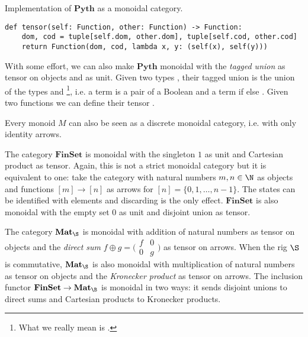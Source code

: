 \begin{python}
{\normalfont Implementation of $\mathbf{Pyth}$ as a monoidal category.}

\begin{verbatim}
def tensor(self: Function, other: Function) -> Function:
    dom, cod = tuple[self.dom, other.dom], tuple[self.cod, other.cod]
    return Function(dom, cod, lambda x, y: (self(x), self(y)))
\end{verbatim}
\end{python}

\begin{example}
With some effort, we can also make $\mathbf{Pyth}$ monoidal with the \emph{tagged union} as tensor on objects and  as unit.
Given two types , their tagged union  is the union of the types  and \footnote
{What we really mean is .}, i.e. a term  is a pair of a Boolean  and a term  if  else .
Given two functions  we can define their tensor .
\end{example}

\begin{example}
Every monoid $M$ can also be seen as a discrete monoidal category, i.e. with only identity arrows.
\end{example}

\begin{example}
The category $\mathbf{FinSet}$ is monoidal with the singleton $1$ as unit and Cartesian product as tensor.
Again, this is not a strict monoidal category but it is equivalent to one: take the category with natural numbers $m, n \in \N$ as objects and functions $[m] \to [n]$ as arrows for $[n] = \{ 0, 1, \dots, n - 1 \}$.
The states can be identified with elements and discarding is the only effect.
$\mathbf{FinSet}$ is also monoidal with the empty set $0$ as unit and disjoint union as tensor.
\end{example}

\begin{example}
The category $\mathbf{Mat}_\S$ is monoidal with addition of natural numbers as tensor on objects and the \emph{direct sum} $f \oplus g = \big(\begin{smallmatrix}f & 0\\ 0 & g\end{smallmatrix}\big)$ as tensor on arrows.
When the rig $\S$ is commutative, $\mathbf{Mat}_\S$ is also monoidal with multiplication of natural numbers as tensor on objects and the \emph{Kronecker product} as tensor on arrows.
The inclusion functor $\mathbf{FinSet} \to \mathbf{Mat}_\B$ is monoidal in two ways: it sends disjoint unions to direct sums and Cartesian products to Kronecker products.
\end{example}

